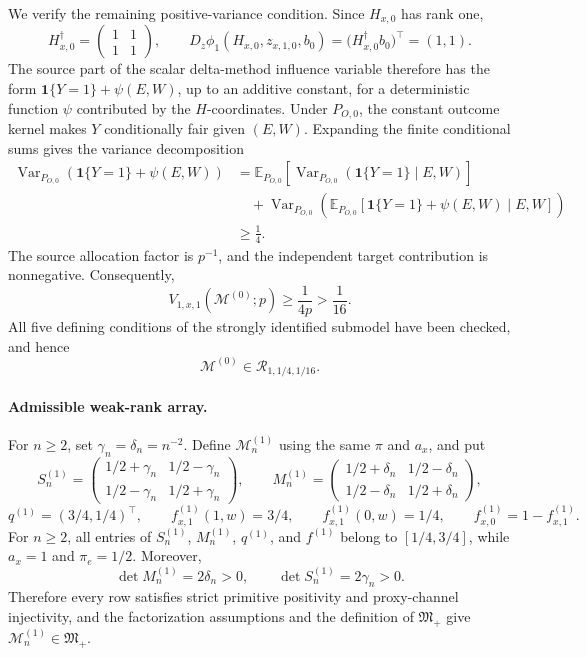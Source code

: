 We verify the remaining positive-variance condition. Since \(H_{x,0}\) has rank one,
\[
H_{x,0}^{\dagger}=
\begin{pmatrix}1&1\\1&1\end{pmatrix},
\qquad
D_z\phi_1(H_{x,0},z_{x,1,0},b_0)
=\bigl(H_{x,0}^{\dagger}b_0\bigr)^{\top}
=(1,1).
\]
The source part of the scalar delta-method influence variable therefore has the form
\(\mathbf 1\{Y=1\}+\psi(E,W)\), up to an additive constant, for a deterministic function \(\psi\) contributed by the \(H\)-coordinates. Under \(P_{O,0}\), the constant outcome kernel makes \(Y\) conditionally fair given \((E,W)\). Expanding the finite conditional sums gives the variance decomposition
\[
\begin{split}
\operatorname{Var}_{P_{O,0}}\!\left(\mathbf 1\{Y=1\}+\psi(E,W)\right)
&=\mathbb E_{P_{O,0}}\!\left[
\operatorname{Var}_{P_{O,0}}\!\left(\mathbf 1\{Y=1\}\mid E,W\right)
\right]\\
&\quad+
\operatorname{Var}_{P_{O,0}}\!\left(
\mathbb E_{P_{O,0}}[
\mathbf 1\{Y=1\}+\psi(E,W)\mid E,W]
\right)\\
&\ge\frac14.
\end{split}
\]
The source allocation factor is \(p^{-1}\), and the independent target contribution is nonnegative. Consequently,
\[
V_{1,x,1}(\mathcal M^{(0)};p)\ge\frac1{4p}>\frac1{16}.
\]
All five defining conditions of the strongly identified submodel have been checked, and hence
\[
\mathcal M^{(0)}\in\mathcal R_{1,1/4,1/16}.
\]

\paragraph{Admissible weak-rank array.}
For \(n\ge2\), set \(\gamma_n=\delta_n=n^{-2}\). Define \(\mathcal M^{(1)}_n\) using the same \(\pi\) and \(a_x\), and put
\[
S^{(1)}_n=
\begin{pmatrix}
1/2+\gamma_n&1/2-\gamma_n\\
1/2-\gamma_n&1/2+\gamma_n
\end{pmatrix},\qquad
M^{(1)}_n=
\begin{pmatrix}
1/2+\delta_n&1/2-\delta_n\\
1/2-\delta_n&1/2+\delta_n
\end{pmatrix},
\]
\[
q^{(1)}=(3/4,1/4)^{\top},\qquad
f^{(1)}_{x,1}(1,w)=3/4,\qquad
f^{(1)}_{x,1}(0,w)=1/4,\qquad
f^{(1)}_{x,0}=1-f^{(1)}_{x,1}.
\]
For \(n\ge2\), all entries of \(S^{(1)}_n\), \(M^{(1)}_n\), \(q^{(1)}\), and \(f^{(1)}\) belong to \([1/4,3/4]\), while \(a_x=1\) and \(\pi_e=1/2\). Moreover,
\[
\det M^{(1)}_n=2\delta_n>0,\qquad
\det S^{(1)}_n=2\gamma_n>0.
\]
Therefore every row satisfies strict primitive positivity and proxy-channel injectivity, and the factorization assumptions and the definition of \(\mathfrak M_{+}\) give
\(\mathcal M^{(1)}_n\in\mathfrak M_{+}\).

